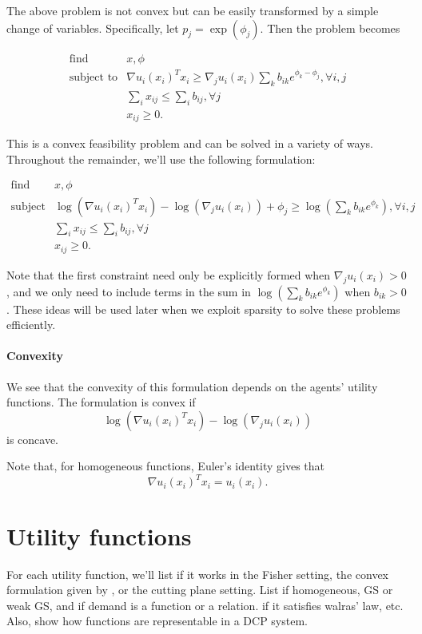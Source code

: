 \documentclass{article}
\begin{document}
The above problem is not convex but can be easily transformed by a simple change of variables. Specifically, let $p_j = \exp(\phi_j)$.
Then the problem becomes

\[
\begin{array}{ll}
\mbox{find} & x, \phi \\
\mbox{subject to} & \nabla u_i(x_i)^T x_i \geq  \nabla_j u_i(x_i) \sum_k b_{ik} e^{\phi_k - \phi_j}, \forall i,j\\
& \sum_i x_{ij} \leq \sum_i b_{ij}, \forall j\\
& x_{ij} \geq 0.
\end{array}
\]

This is a convex feasibility problem and can be solved in a variety of ways.
Throughout the remainder, we'll use the following formulation:

\[
\begin{array}{ll}
\mbox{find} & x, \phi \\
\mbox{subject to} & \log(\nabla u_i(x_i)^T x_i) - \log(\nabla_j u_i(x_i)) + \phi_j 
\geq \log(\sum_k b_{ik} e^{\phi_k}), \forall i,j\\
& \sum_i x_{ij} \leq \sum_i b_{ij}, \forall j\\
& x_{ij} \geq 0.
\end{array}
\]

Note that the first constraint need only be explicitly formed when $\nabla_j u_i(x_i) > 0$, and we only need to include terms in the sum in
$\log(\sum_k b_{ik} e^{\phi_k})$ when $b_{ik} > 0$. These ideas will be used later when we exploit sparsity to solve these problems efficiently.

\paragraph{Convexity}
We see that the convexity of this formulation depends on the agents' utility functions. The formulation is convex if
\[
\log(\nabla u_i(x_i)^T x_i) - \log(\nabla_j u_i(x_i))
\]
is concave.

Note that, for homogeneous functions, Euler's identity gives that
\[
\nabla u_i(x_i)^T x_i = u_i(x_i).
\]

\section{Utility functions}
For each utility function, we'll list if it works in the Fisher setting, the convex formulation given by \cite{chen2010equilibrium}, or the cutting plane setting. List if homogeneous, GS or weak GS, and if demand is a function or a relation. if it satisfies walras' law, etc. Also, show how functions are representable in a DCP system.
\end{document}
